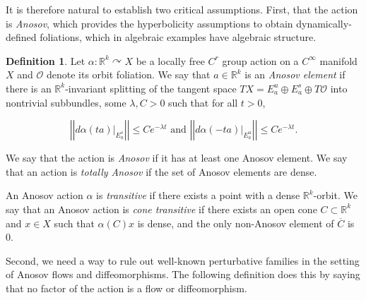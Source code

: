 \documentclass[12pt]{amsart}
\theoremstyle{definition}
\newtheorem{definition}[theorem]{Definition}
\theoremstyle{remark}
\numberwithin{equation}{section}
\newcommand{\R}{\mathbb{R}}
\newcommand{\mc}{\mathcal}
\newcommand{\norm}[1]{{\left|\left| #1 \right|\right|}}
\newtheorem{Structural Stability Theorem}[theorem]{Structural Stability Theorem}
\begin{document}

 It is therefore natural to establish two critical assumptions. First, that the action is {\it Anosov}, which provides the hyperbolicity assumptions to obtain dynamically-defined foliations, which in algebraic examples have algebraic structure.

\begin{definition}
\label{def:anosov}
Let $\alpha : \R^k \curvearrowright X$ be a locally free $C^r$ group action on a $C^\infty$ manifold $X$ and $\mc O$ denote its orbit foliation. We say that $a \in \R^k$ is an {\it Anosov element} if there is an $\R^k$-invariant splitting of the tangent space $TX = E^u_a \oplus E^s_a \oplus T\mc O$ {  into nontrivial subbundles}, some $\lambda, C > 0$ such that for all $t > 0$,

\[ \norm{d\alpha(ta)|_{E^s_a}} \le Ce^{-\lambda t} \mbox{ and } \norm{d\alpha(-ta)|_{E^u_a}} \le Ce^{-\lambda t}. \]

 We say that the action is {\it Anosov} if it has at least one Anosov element. We say that an action is {\it totally Anosov} if the set of Anosov elements are dense. 
 
 An Anosov action $\alpha$ is {\it transitive} if there exists a point with a dense $\R^k$-orbit. We say that an Anosov action is {\it cone transitive} if there exists an open cone $C \subset \R^k$ and $x \in X$ such that { $\alpha(C)x$} is dense, and the only non-Anosov element of $\overline{C}$ is 0.
\end{definition}

Second, we need a way to rule out well-known perturbative families in the setting of Anosov flows and diffeomorphisms. The following definition does this by saying that no factor of the action is a flow or diffeomorphism.
\end{document}
